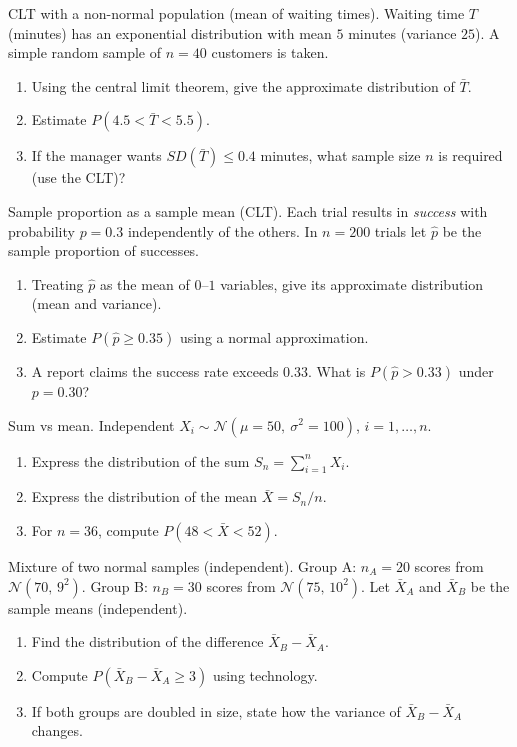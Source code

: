 \documentclass[11pt]{article}
\def\textbf#1{#1}%
\def\mathrm#1{#1}%
\newcounter{question}
\begin{document}
\begin{question}
\textbf{CLT with a non-normal population (mean of waiting times).}
Waiting time $T$ (minutes) has an exponential distribution with mean $5$ minutes (variance $25$).
A simple random sample of $n=40$ customers is taken.
\begin{enumerate}
  \item Using the central limit theorem, give the approximate distribution of $\bar T$.
  \item Estimate $P(4.5<\bar T<5.5)$.
  \item If the manager wants $\mathrm{SD}(\bar T)\le 0.4$ minutes, what sample size $n$ is required (use the CLT)?
\end{enumerate}
\end{question}

\begin{question}
\textbf{Sample proportion as a sample mean (CLT).}
Each trial results in \emph{success} with probability $p=0.3$ independently of the others. In $n=200$ trials let
$\hat p$ be the sample proportion of successes.
\begin{enumerate}
  \item Treating $\hat p$ as the mean of $0$–$1$ variables, give its approximate distribution (mean and variance).
  \item Estimate $P(\hat p\ge 0.35)$ using a normal approximation.
  \item A report claims the success rate exceeds $0.33$. What is $P(\hat p>0.33)$ under $p=0.30$?
\end{enumerate}
\end{question}

\begin{question}
\textbf{Sum vs mean.}
Independent $X_i\sim\mathcal N(\mu=50,\ \sigma^2=100)$, $i=1,\dots,n$.
\begin{enumerate}
  \item Express the distribution of the sum $S_n=\sum_{i=1}^n X_i$.
  \item Express the distribution of the mean $\bar X=S_n/n$.
  \item For $n=36$, compute $P(48<\bar X<52)$.
\end{enumerate}
\end{question}


\begin{question}
\textbf{Mixture of two normal samples (independent).}
Group A: $n_A=20$ scores from $\mathcal N(70,\,9^2)$.
Group B: $n_B=30$ scores from $\mathcal N(75,\,10^2)$.
Let $\bar X_A$ and $\bar X_B$ be the sample means (independent).
\begin{enumerate}
  \item Find the distribution of the difference $\bar X_B-\bar X_A$.
  \item Compute $P(\bar X_B-\bar X_A\ge 3)$ using technology.
  \item If both groups are doubled in size, state how the variance of $\bar X_B-\bar X_A$ changes.
\end{enumerate}
\end{question}
\end{document}
